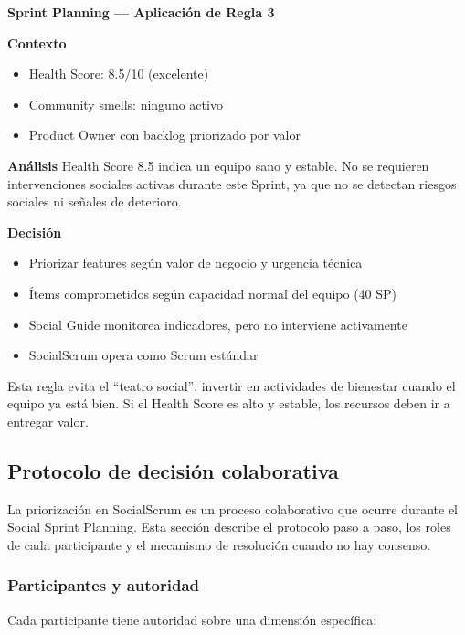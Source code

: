 \begin{escenario}
    \textbf{Sprint Planning — Aplicación de Regla 3}

    \textbf{Contexto}
    \begin{itemize}
        \item Health Score: 8.5/10 (excelente)
        \item Community smells: ninguno activo
        \item Product Owner con backlog priorizado por valor
    \end{itemize}

    \textbf{Análisis}
    Health Score 8.5 indica un equipo sano y estable. No se requieren
    intervenciones sociales activas durante este Sprint, ya que no se
    detectan riesgos sociales ni señales de deterioro.

    \textbf{Decisión}
    \begin{itemize}
        \item Priorizar features según valor de negocio y urgencia técnica
        \item Ítems comprometidos según capacidad normal del equipo (40 SP)
        \item Social Guide monitorea indicadores, pero no interviene activamente
        \item SocialScrum opera como Scrum estándar
    \end{itemize}

\end{escenario}

Esta regla evita el ``teatro social'': invertir en actividades de bienestar cuando el equipo ya está bien. Si el Health Score es alto y estable, los recursos deben ir a entregar valor.

\subsection{Protocolo de decisión colaborativa}

La priorización en SocialScrum es un proceso colaborativo que ocurre durante el Social Sprint Planning. Esta sección describe el protocolo paso a paso, los roles de cada participante y el mecanismo de resolución cuando no hay consenso.

\subsubsection{Participantes y autoridad}

Cada participante tiene autoridad sobre una dimensión específica:

